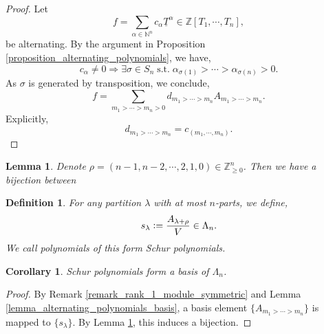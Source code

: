 \documentclass{article}
\newtheorem{definition}{Definition}[section]
\newtheorem{lemma}{Lemma}[section]
\newtheorem{corollary}{Corollary} [section]
\numberwithin{equation}{theorem}
\DeclareMathOperator{\st}{s.t.}
\newcommand{\defeq}{\vcentcolon=}
\newcommand{\N}[0]{\mathbb{N}}
\newcommand{\Z}[0]{\mathbb{Z}}
\begin{document}
\begin{proof}
    Let 
\begin{equation*}
    f = \sum_{\alpha\in\N^{n}}c_\alpha \underline{T}^\alpha\in\Z[T_1,\cdots,T_n],
\end{equation*}
be alternating. By the argument in Proposition \ref{proposition_alternating_polynomials}, we have,
\begin{equation*}
    c_{\alpha}\not=0\Rightarrow \exists\sigma\in S_n\st \alpha_{\sigma(1)}>\cdots>\alpha_{\sigma(n)}>0.
\end{equation*}
As $\sigma$ is generated by transposition, we conclude,
\begin{equation*}
    f = \sum_{m_1>\cdots>m_n>0}d_{m_1>\cdots>m_n}A_{m_1>\cdots>m_n}.
\end{equation*}
Explicitly,
\begin{equation*}
    d_{m_1>\cdots>m_n} = c_{(m_1,\cdots,m_n)}.
\end{equation*}
\end{proof}
\begin{lemma}
    \label{lemma_bijection_partitions}
    Denote $\rho=(n-1,n-2,\cdots,2,1,0)\in\Z_{\geq0}^n$. Then we have a bijection between
    \begin{center}
    \end{center}
\end{lemma}
\begin{definition}
    For any partition $\lambda$ with at most $n$-parts, we define,
    \begin{equation*}
        s_\lambda\defeq {\frac {A_{\lambda+\rho}} V}\in\Lambda_n.
    \end{equation*}
    We call polynomials of this form Schur polynomials.
\end{definition}
\begin{corollary}
    \label{corollary_basis_symmetric_pols_schur}
    Schur polynomials form a basis of $\Lambda_n$. 
\end{corollary}
\begin{proof}
    By Remark \ref{remark_rank_1_module_symmetric} and Lemma \ref{lemma_alternating_polynomials_basis}, a basis element $\{A_{m_1>\cdots>m_n}\}$ is mapped to $\{s_\lambda\}$. By Lemma \ref{lemma_bijection_partitions}, this induces a bijection.
\end{proof}
\end{document}

